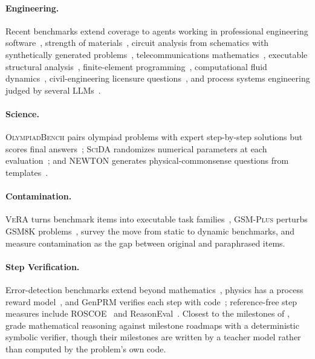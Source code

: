 \paragraph{Engineering.} Recent benchmarks extend coverage to agents working in professional
engineering software~\citep{gao2026engiworld}, strength of materials~\citep{wan2025som1k}, circuit
analysis from schematics with synthetically generated problems~\citep{akbari2025circuitsense},
telecommunications mathematics~\citep{colle2025telemath}, executable structural
analysis~\citep{qin2026structureclaw}, finite-element programming~\citep{mohammadzadeh2025fembench},
computational fluid dynamics~\citep{somasekharan2026cfdllmbench}, civil-engineering licensure
questions~\citep{silwal2026pecivilbench}, and process systems engineering judged by several
LLMs~\citep{sukpancharoen2026psebench}.

\paragraph{Science.} \textsc{OlympiadBench} pairs olympiad problems with expert step-by-step
solutions but scores final answers~\citep{he2024olympiadbench}; \textsc{SciDA} randomizes numerical
parameters at each evaluation~\citep{zhou2025scida}; and \textsc{NEWTON} generates
physical-commonsense questions from templates~\citep{wang2023newton}.

\paragraph{Contamination.} \textsc{VeRA} turns benchmark items into executable task
families~\citep{cheng2026vera}, \textsc{GSM-Plus} perturbs \textsc{GSM8K}
problems~\citep{li2024gsmplus}, \citet{chen2025staticdynamicsurvey} survey the move from static to
dynamic benchmarks, and \citet{xiao2026contaminationrankings} measure contamination as the gap
between original and paraphrased items.

\paragraph{Step Verification.} Error-detection benchmarks extend beyond
mathematics~\citep{tyen2023bigbenchmistake, zeng2024mrben, he2025deltabench, sun2026lsrben},
physics has a process reward model~\citep{dong2026physprm}, and GenPRM verifies each step with
code~\citep{zhao2025genprm}; reference-free step measures include ROSCOE~\citep{golovneva2022roscoe}
and ReasonEval~\citep{xia2024reasoneval}.
Closest to the milestones of \ourdataset, \citet{wang2026milestoneoracles} grade mathematical
reasoning against milestone roadmaps with a deterministic symbolic verifier, though their milestones
are written by a teacher model rather than computed by the problem's own code.

